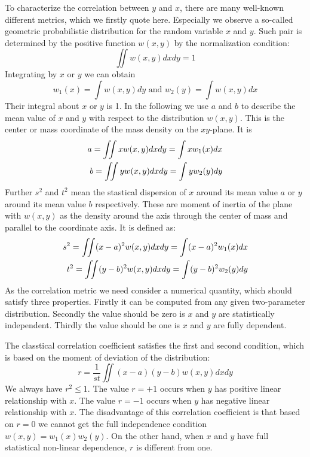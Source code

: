\documentclass{article}
\begin{document}
To characterize the correlation between $y$ and $x$,
there are many well-known different metrics, which we firstly quote here. Especially we observe a so-called
geometric probabilistic distribution for the random variable $x$ and $y$. Such pair is determined by the
positive function $w(x,y)$ by the normalization condition:
\begin{equation}\label{eq:wxy}
    \iint w(x,y) dx dy = 1
\end{equation}
Integrating by $x$ or $y$ we can obtain
\begin{equation}\label{eq:w12}
    w_1(x) = \int w(x,y)dy \textrm{ and }
    w_2(y) = \int w(x,y)dx
\end{equation}
Their integral about $x$ or $y$ is 1. In the following we use $a$
and $b$ to describe the mean value of $x$ and $y$
with respect to the distribution $w(x,y)$.
This is the center or mass coordinate of the mass
density on the $xy$-plane. It is
\begin{align}
    a = \iint x w(x,y) dx dy = \int x w_1(x)dx \notag \\
    b = \iint y w(x,y) dx dy = \int y w_2(y)dy \label{eq:ab}
\end{align}
Further $s^2$ and $t^2$ mean the stastical dispersion of $x$ around its mean value $a$
or $y$ around its mean value $b$ respectively.
These are moment of inertia of the plane with $w(x,y)$ as the density around the axis through the
center of mass and parallel to the coordinate axis. It is defined as:
\begin{align}
    s^2 = \iint (x-a)^2 w(x,y) dx dy = \int (x-a)^2 w_1(x)dx \notag \\
    t^2 = \iint (y-b)^2 w(x,y) dx dy = \int (y-b)^2 w_2(y)dy 
    \label{eq:st}
\end{align}
As the correlation metric we need consider a numerical quantity, which should satisfy three properties.
Firstly it can be computed from any given two-parameter distribution. Secondly the value should
be zero is $x$ and $y$ are statistically independent. Thirdly the value should be one is $x$ and $y$
are fully dependent.

The classtical correlation coefficient satisfies the first and second condition, which is based on the moment of deviation
of the distribution:
\begin{equation}
r = \frac{1}{st} \iint (x-a)(y-b)w(x,y)dxdy
\end{equation}
We always have $r^2 \leq 1$.
The value $r=+ 1$ occurs when $y$ has positive linear relationship with $x$.
The value $r= - 1$ occurs when $y$ has negative linear relationship with $x$.
The disadvantage of this correlation coefficient is that based on $r=0$ we cannot get the
full independence condition $w(x,y)=w_1(x)w_2(y)$.
On the other hand, when $x$ and $y$ have full statistical non-linear dependence, $r$
is different from one.
\end{document}

